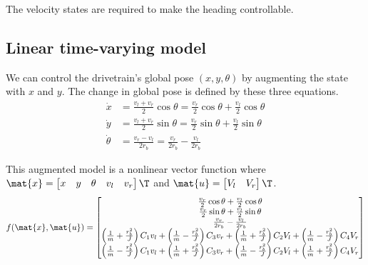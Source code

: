 The velocity states are required to make the heading controllable.

\subsection{Linear time-varying model}

We can control the drivetrain's global pose $(x, y, \theta)$ by augmenting the
state with $x$ and $y$. The change in global pose is defined by these three
equations.
\begin{align*}
  \dot{x} &= \frac{v_l + v_r}{2}\cos\theta = \frac{v_r}{2}\cos\theta +
    \frac{v_l}{2}\cos\theta \\
  \dot{y} &= \frac{v_l + v_r}{2}\sin\theta = \frac{v_r}{2}\sin\theta +
    \frac{v_l}{2}\sin\theta \\
  \dot{\theta} &= \frac{v_r - v_l}{2r_b} = \frac{v_r}{2r_b} - \frac{v_l}{2r_b}
\end{align*}

This augmented model is a nonlinear vector function where
$\mat{x} = \begin{bmatrix} x & y & \theta & v_l & v_r \end{bmatrix}\T$ and
$\mat{u} = \begin{bmatrix} V_l & V_r \end{bmatrix}\T$.
\begin{equation}
  f(\mat{x}, \mat{u}) =
  \begin{bmatrix}
    \frac{v_r}{2}\cos\theta + \frac{v_l}{2}\cos\theta \\
    \frac{v_r}{2}\sin\theta + \frac{v_l}{2}\sin\theta \\
    \frac{v_r}{2r_b} - \frac{v_l}{2r_b} \\
    \left(\frac{1}{m} + \frac{r_b^2}{J}\right) C_1 v_l +
      \left(\frac{1}{m} - \frac{r_b^2}{J}\right) C_3 v_r +
      \left(\frac{1}{m} + \frac{r_b^2}{J}\right) C_2 V_l +
      \left(\frac{1}{m} - \frac{r_b^2}{J}\right) C_4 V_r \\
    \left(\frac{1}{m} - \frac{r_b^2}{J}\right) C_1 v_l +
      \left(\frac{1}{m} + \frac{r_b^2}{J}\right) C_3 v_r +
      \left(\frac{1}{m} - \frac{r_b^2}{J}\right) C_2 V_l +
      \left(\frac{1}{m} + \frac{r_b^2}{J}\right) C_4 V_r
  \end{bmatrix}
  \label{eq:ltv_diff_drive_f}
\end{equation}

